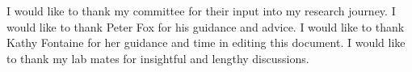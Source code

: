 

I would like to thank my committee for their input into my research journey.
I would like to thank Peter Fox for his guidance and advice.
I would like to thank Kathy Fontaine for her guidance and time in editing this document.
I would like to thank my lab mates for insightful and lengthy discussions.